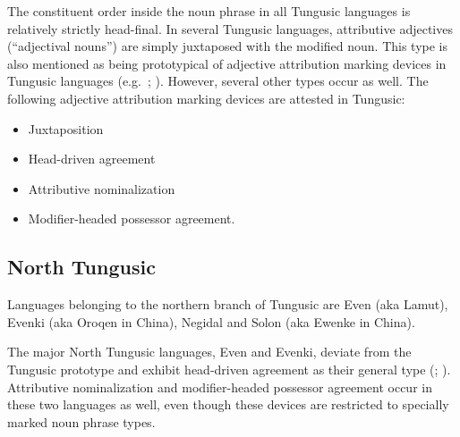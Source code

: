 The constituent order inside the noun phrase in all Tungusic languages is relatively strictly head-final. In several Tungusic languages, attributive adjectives (“adjectival nouns”) are simply juxtaposed with the modified noun. This type is also mentioned as being prototypical of adjective attribution marking devices in Tungusic languages (e.g.~\citealt{sunik1968a}; \citealt[133]{kormusin2005}). However, several other types occur as well. The following adjective attribution marking devices are attested in Tungusic:
\begin{itemize}
\item Juxtaposition
\item Head\hyp{}driven agreement
\item Attributive nominalization
\item Modifier\hyp{}headed possessor agreement.
\end{itemize}

\subsection{North Tungusic}
Languages belonging to the northern branch of Tungusic are Even (aka Lamut), Evenki (aka Oroqen in China), Negidal and Solon (aka Ewenke in China).

The major North Tungusic languages, Even and Evenki, deviate from the Tungusic prototype and exhibit head\hyp{}driven agreement as their general type (\citealt[11]{malchukov1995}; \citealt[18]{bulatova-etal1999}). Attributive nominalization and modifier\hyp{}headed possessor agreement occur in these two languages as well, even though these devices are restricted to specially marked noun phrase types.

